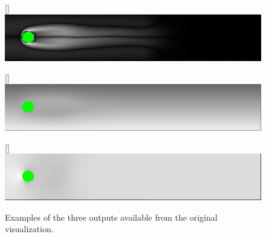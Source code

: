 \begin{figure}[ht]
    \centering
    [\linewidth]{\includegraphics[width=\linewidth,natwidth=660,natheight=120]{Ch20Research/figures/output_zeta.png}
    }
    
    [\linewidth]{\includegraphics[width=\linewidth,natwidth=660,natheight=120]{Ch20Research/figures/output_psi.png}
    }
    
    [\linewidth]{\includegraphics[width=\linewidth,natwidth=660,natheight=120]{Ch20Research/figures/output_pressure.png}
    }
    \caption{Examples of the three outputs available from the original visualization.}%
    \label{fig:ppms}
\end{figure}